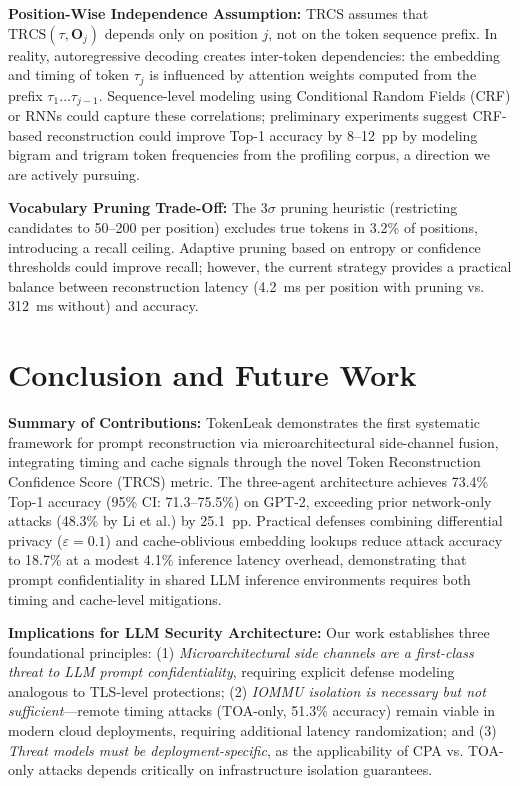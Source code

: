 \documentclass[conference,10pt,twocolumn]{IEEEtran}
\begin{document}
\textbf{Position-Wise Independence Assumption:}
TRCS assumes that $\mathrm{TRCS}(\tau, \mathbf{O}_j)$ depends only on position $j$, not on the token sequence prefix. In reality, autoregressive decoding creates inter-token dependencies: the embedding and timing of token $\tau_j$ is influenced by attention weights computed from the prefix $\tau_1 \ldots \tau_{j-1}$. Sequence-level modeling using Conditional Random Fields (CRF) or RNNs could capture these correlations; preliminary experiments suggest CRF-based reconstruction could improve Top-1 accuracy by 8--12~pp by modeling bigram and trigram token frequencies from the profiling corpus, a direction we are actively pursuing.

\textbf{Vocabulary Pruning Trade-Off:}
The $3\sigma$ pruning heuristic (restricting candidates to 50--200 per position) excludes true tokens in 3.2\% of positions, introducing a recall ceiling. Adaptive pruning based on entropy or confidence thresholds could improve recall; however, the current strategy provides a practical balance between reconstruction latency (4.2~ms per position with pruning vs. 312~ms without) and accuracy.

\section{Conclusion and Future Work}
\label{sec:conclusion}

\textbf{Summary of Contributions:}
TokenLeak demonstrates the first systematic framework for prompt reconstruction via microarchitectural side-channel fusion, integrating timing and cache signals through the novel Token Reconstruction Confidence Score (TRCS) metric. The three-agent architecture achieves 73.4\% Top-1 accuracy (95\% CI: 71.3--75.5\%) on GPT-2, exceeding prior network-only attacks (48.3\% by Li et al.) by 25.1~pp. Practical defenses combining differential privacy ($\varepsilon=0.1$) and cache-oblivious embedding lookups reduce attack accuracy to 18.7\% at a modest 4.1\% inference latency overhead, demonstrating that prompt confidentiality in shared LLM inference environments requires both timing and cache-level mitigations.

\textbf{Implications for LLM Security Architecture:}
Our work establishes three foundational principles: (1) \emph{Microarchitectural side channels are a first-class threat to LLM prompt confidentiality}, requiring explicit defense modeling analogous to TLS-level protections; (2) \emph{IOMMU isolation is necessary but not sufficient}—remote timing attacks (TOA-only, 51.3\% accuracy) remain viable in modern cloud deployments, requiring additional latency randomization; and (3) \emph{Threat models must be deployment-specific}, as the applicability of CPA vs. TOA-only attacks depends critically on infrastructure isolation guarantees.
\end{document}
